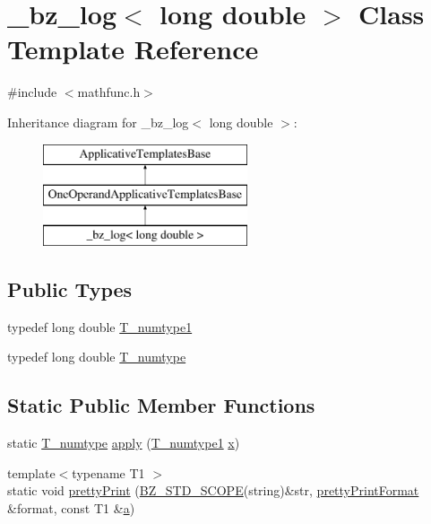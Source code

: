 \hypertarget{class__bz__log_3_01long_01double_01_4}{}\section{\+\_\+bz\+\_\+log$<$ long double $>$ Class Template Reference}
\label{class__bz__log_3_01long_01double_01_4}


{\ttfamily \#include $<$mathfunc.\+h$>$}

Inheritance diagram for \+\_\+bz\+\_\+log$<$ long double $>$\+:\begin{figure}[H]
\begin{center}
\leavevmode
\includegraphics[height=3.000000cm]{class__bz__log_3_01long_01double_01_4}
\end{center}
\end{figure}
\subsection*{Public Types}
\begin{DoxyCompactItemize}
\item 
typedef long double \hyperlink{class__bz__log_3_01long_01double_01_4_a800ca3393838fde30227707b0cabeba0}{T\+\_\+numtype1}
\item 
typedef long double \hyperlink{class__bz__log_3_01long_01double_01_4_ad566b3917972055e612f1872b1a4d587}{T\+\_\+numtype}
\end{DoxyCompactItemize}
\subsection*{Static Public Member Functions}
\begin{DoxyCompactItemize}
\item 
static \hyperlink{class__bz__log_3_01long_01double_01_4_ad566b3917972055e612f1872b1a4d587}{T\+\_\+numtype} \hyperlink{class__bz__log_3_01long_01double_01_4_a130eb7a2d6376f8db4141c260bfd9fa5}{apply} (\hyperlink{class__bz__log_3_01long_01double_01_4_a800ca3393838fde30227707b0cabeba0}{T\+\_\+numtype1} \hyperlink{vecnorm1_8cc_ac73eed9e41ec09d58f112f06c2d6cb63}{x})
\item 
{\footnotesize template$<$typename T1 $>$ }\\static void \hyperlink{class__bz__log_3_01long_01double_01_4_a90ebd029cbdcc7f46f048fdaa6be386f}{pretty\+Print} (\hyperlink{numinquire_8h_a2b24ffc3b4ef9803956bc7715c6c7b83}{B\+Z\+\_\+\+S\+T\+D\+\_\+\+S\+C\+O\+P\+E}(string)\&str, \hyperlink{classprettyPrintFormat}{pretty\+Print\+Format} \&format, const T1 \&\hyperlink{gen__mat5files_8m_aae328bf20413f220e38aec4d95bfd6da}{a})
\end{DoxyCompactItemize}


